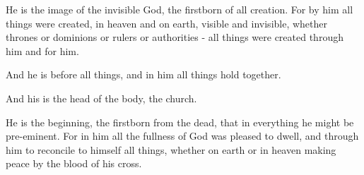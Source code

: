\documentclass[12pt]{article}
\begin{document}
\begin{poem}
    \Large
    \begin{stanza}
        {\pmsentence} He is the image of the invisible God,\verseline
        {\verseindent} the firstborn of all creation.\verseline
        {\pmsentence} For by him all things were created,\verseline
        {\verseindent} in heaven and on earth,\verseline
        {\verseindent} visible and invisible,\verseline
        {\verseindent}{\verseindent} whether thrones or dominions\verseline
        {\verseindent}{\verseindent} or rulers or authorities -\verseline
        {\verseindent} all things were created\verseline
        {\verseindent} through him and for him.
    \end{stanza}
    \begin{stanza}
        {\pmsentence} And he is before all things,\verseline
        {\verseindent} and in him all things hold together.
    \end{stanza}
    \begin{stanza}
        {\pmsentence} And his is the head\verseline
        {\verseindent} of the body, the church.
    \end{stanza}
    \begin{stanza}
        He is the beginning,\verseline
        {\verseindent} the firstborn from the dead,\verseline
        {\verseindent}{\verseindent} that in everything he might be pre-eminent.\verseline
        {\pmsentence} For in him all the fullness of God\verseline
        {\verseindent} was pleased to dwell,\verseline
        {\pmsentence} and through him to reconcile\verseline
        {\verseindent}{\verseindent} to himself all things,\verseline
        {\verseindent} whether on earth\verseline
        {\verseindent}{\verseindent} or in heaven\verseline
        {\verseindent} making peace by the blood\verseline
        {\verseindent}{\verseindent} of his cross.
    \end{stanza}
\end{poem}
\end{document}
